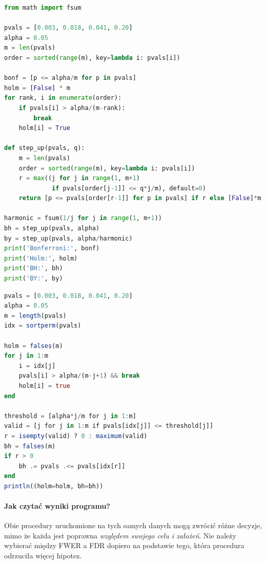 \documentclass[11pt,a4paper,oneside]{report}
\numberwithin{equation}{chapter}
\theoremstyle{plain}
\theoremstyle{definition}
\theoremstyle{remark}
\begin{document}
\begin{lstlisting}[language=Python,caption={Kompletny program w Pythonie: Bonferroni, Holm, BH i BY bez zewnętrznych pakietów.}]
from math import fsum

pvals = [0.003, 0.018, 0.041, 0.20]
alpha = 0.05
m = len(pvals)
order = sorted(range(m), key=lambda i: pvals[i])

bonf = [p <= alpha/m for p in pvals]
holm = [False] * m
for rank, i in enumerate(order):
    if pvals[i] > alpha/(m-rank):
        break
    holm[i] = True

def step_up(pvals, q):
    m = len(pvals)
    order = sorted(range(m), key=lambda i: pvals[i])
    r = max((j for j in range(1, m+1)
             if pvals[order[j-1]] <= q*j/m), default=0)
    return [p <= pvals[order[r-1]] for p in pvals] if r else [False]*m

harmonic = fsum(1/j for j in range(1, m+1))
bh = step_up(pvals, alpha)
by = step_up(pvals, alpha/harmonic)
print('Bonferroni:', bonf)
print('Holm:', holm)
print('BH:', bh)
print('BY:', by)
\end{lstlisting}

\begin{lstlisting}[language=Julia,caption={Obliczenie krokowych korekt Holma i BH w Julii bez pakietów zewnętrznych.}]
pvals = [0.003, 0.018, 0.041, 0.20]
alpha = 0.05
m = length(pvals)
idx = sortperm(pvals)

holm = falses(m)
for j in 1:m
    i = idx[j]
    pvals[i] > alpha/(m-j+1) && break
    holm[i] = true
end

threshold = [alpha*j/m for j in 1:m]
valid = [j for j in 1:m if pvals[idx[j]] <= threshold[j]]
r = isempty(valid) ? 0 : maximum(valid)
bh = falses(m)
if r > 0
    bh .= pvals .<= pvals[idx[r]]
end
println((holm=holm, bh=bh))
\end{lstlisting}

\paragraph{Jak czytać wyniki programu?}
Obie procedury uruchomione na tych samych danych mogą
zwrócić różne decyzje, mimo że każda jest poprawna
\emph{względem swojego celu i założeń}. Nie należy
wybierać między FWER a FDR dopiero na podstawie
tego, która procedura odrzuciła więcej hipotez.
\end{document}
